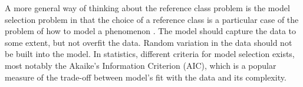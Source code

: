 \documentclass{article}
\newcommand{\pr}{\mathsf{Pr}}
\begin{document}
A more general way of thinking about the reference class problem is the model selection problem
in that the choice of a reference class is a particular case of the problem of how to model a phenomenon \citep{cheng2009practical}. %
The model should capture the data to some extent, but not overfit the data. Random variation in the data should not be built into the model. %
In statistics, different criteria for model selection exists, most notably the Akaike's Information Criterion (AIC), which is a popular measure of the trade-off between  model's fit with the data and its complexity. %
\end{document}
